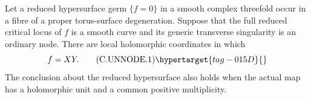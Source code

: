 \begin{proposition}\hypertarget{tag-01EZ}{}\label{cdp:st:C.2.UN.9}


Let a reduced hypersurface germ $\{f=0\}$ in a smooth
complex threefold occur in a fibre of a proper torus-surface
degeneration. Suppose that the full reduced critical locus
of $f$ is a smooth curve and its generic transverse
singularity is an ordinary node. There are local
holomorphic coordinates in which
\[
                            f=XY.                  \tag{C.UNNODE.1}\hypertarget{tag-015D}{}\label{cdp:eq:C.UNNODE.1}
\]
The conclusion about the reduced hypersurface also holds
when the actual map has a holomorphic unit and a common
positive multiplicity.
\end{proposition}
